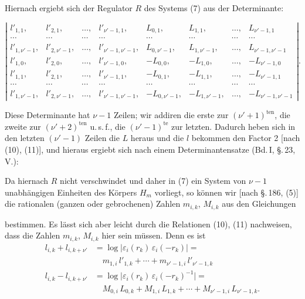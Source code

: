 
Hiernach ergiebt sich der Regulator $R$ des Systems (7) aus
der Determinante:

\[
\left|
\begin{array}{cccccccc}
l'_{1,1}, & l'_{2,1}, & \ldots, & l'_{\nu'-1,1}, & L_{0,1}, & L_{1,1}, & \ldots, & L_{\nu'-1,1} \\
\cdots & \cdots & \cdots & \cdots & \cdots & \cdots & \cdots & \cdots \\
l'_{1,\nu'-1}, & l'_{2,\nu'-1}, & \ldots, & l'_{\nu'-1,\nu'-1}, & L_{0,\nu'-1}, & L_{1,\nu'-1}, & \ldots, & L_{\nu'-1,\nu'-1} \\
l'_{1,0}, & l'_{2,0}, & \ldots, & l'_{\nu'-1,0}, & -L_{0,0}, & -L_{1,0}, & \ldots, & -L_{\nu'-1,0} \\
l'_{1,1}, & l'_{2,1}, & \ldots, & l'_{\nu'-1,1}, & -L_{0,1}, & -L_{1,1}, & \ldots, & -L_{\nu'-1,1} \\
\cdots & \cdots & \cdots & \cdots & \cdots & \cdots & \cdots & \cdots \\
l'_{1,\nu'-1}, & l'_{2,\nu'-1}, & \ldots, & l'_{\nu'-1,\nu'-1}, & -L_{0,\nu'-1}, & -L_{1,\nu'-1}, & \ldots, & -L_{\nu'-1,\nu'-1}
\end{array}
\right|.
\]

Diese Determinante hat $\nu-1$ Zeilen; wir addiren die erste
zur $(\nu'+1)^{\mathrm{ten}}$, die zweite zur $(\nu'+2)^{\mathrm{ten}}$ u.\,s.\,f., die $(\nu'-1)^{\mathrm{te}}$ zur
letzten. Dadurch heben sich in den letzten $(\nu'-1)$ Zeilen die
$L$ heraus und die $l$ bekommen den Factor 2 [nach (10), (11)],
und hieraus ergiebt sich nach einem Determinantensatze (Bd.\,I,
\S.\,23, V.):

Da hiernach $R$ nicht verschwindet und daher in (7) ein
System von $\nu-1$ unabhängigen Einheiten des Körpers $H_m$ vorliegt,
so können wir [nach \S.\,186, (5)] die rationalen (ganzen
oder gebrochenen) Zahlen $m_{i,k}$, $M_{i,k}$ aus den Gleichungen

bestimmen. Es lässt sich aber leicht durch die Relationen (10), (11)
nachweisen, dass die Zahlen $m_{i,k}$, $M_{i,k}$ hier  sein müssen.
Denn es ist
\[
\begin{aligned}
l_{i,k} + l_{i,k+\nu'} & = \log \lvert \varepsilon_i(r_k)\, \varepsilon_i(-r_k) \rvert = \\
& \quad m_{1,i}\, l'_{1,k} + \cdots + m_{\nu'-1,i}\, l'_{\nu'-1,k} \\
l_{i,k} - l_{i,k+\nu'} & = \log \lvert \varepsilon_i(r_k)\, \varepsilon_i(-r_k)^{-1} \rvert = \\
& \quad M_{0,i}\, L_{0,k} + M_{1,i}\, L_{1,k} + \cdots + M_{\nu'-1,i}\, L_{\nu'-1,k}.
\end{aligned}
\]

